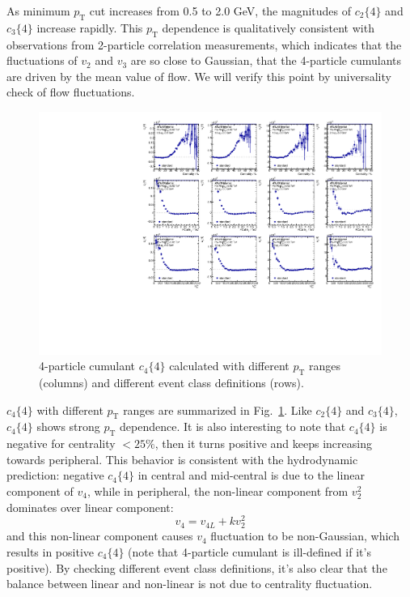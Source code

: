 As minimum $p_\text{T}$ cut increases from 0.5 to 2.0 GeV, the magnitudes of $c_2\{4\}$ and $c_3\{4\}$ increase rapidly. This $p_\text{T}$ dependence is qualitatively consistent with observations from 2-particle correlation measurements, which indicates that the fluctuations of $v_2$ and $v_3$ are so close to Gaussian, that the 4-particle cumulants are driven by the mean value of flow. We will verify this point by universality check of flow fluctuations.

\begin{figure}[H]
\centering
\includegraphics[width=.95\linewidth]{figs/sec_result/forQM/phy_c4_Har4.pdf}
\caption{4-particle cumulant $c_4\{4\}$ calculated with different $p_\text{T}$ ranges (columns) and different event class definitions (rows).}
\label{fig:result_phy_c4_Har4}
\end{figure}

$c_4\{4\}$ with different $p_\text{T}$ ranges are summarized in Fig.~\ref{fig:result_phy_c4_Har4}. Like $c_2\{4\}$ and $c_3\{4\}$, $c_4\{4\}$ shows strong $p_\text{T}$ dependence. It is also interesting to note that $c_4\{4\}$ is negative for centrality $<25\%$, then it turns positive and keeps increasing towards peripheral. This behavior is consistent with the hydrodynamic prediction: negative $c_4\{4\}$ in central and mid-central is due to the linear component of $v_4$, while in peripheral, the non-linear component from $v_2^2$ dominates over linear component:
\begin{equation}
v_4 = v_{4L} + k v_2^2
\end{equation}
and this non-linear component causes $v_4$ fluctuation to be non-Gaussian, which results in positive $c_4\{4\}$ (note that 4-particle cumulant is ill-defined if it's positive). By checking different event class definitions, it's also clear that the balance between linear and non-linear is not due to centrality fluctuation.

